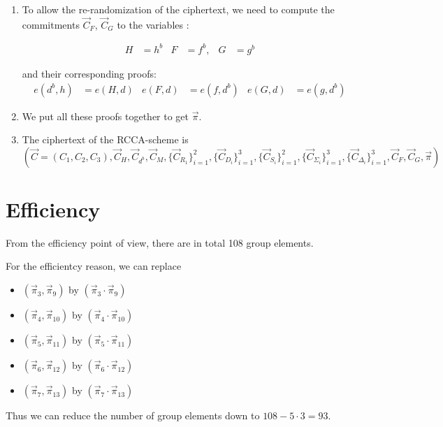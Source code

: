 \begin{description}
\begin{enumerate}
  \item To allow the re-randomization of the ciphertext, we need to compute the commitments $\vec{C}_F$, $\vec{C}_G$ to the variables :

    \begin{align*}
    H &= h^b & F &= f^b, & G&=g^b
    \end{align*}

    and their corresponding proofs:
    \begin{align}
      e(\boxed{d^b}, h) &= e(\boxed{H},d) & e(\boxed{F},d) &= e(f,\boxed{d^b}) & e(\boxed{G}, d) &= e(g, \boxed{d^b})\tag{13, 14, 15}
    \end{align}

    
  \item We put all these proofs together to get $\vec{\pi}$.
  \item The ciphertext of the RCCA-scheme is
    $$(\vec{C} = (C_1, C_2, C_3), \vec{C}_{H}, \vec{C}_{d^b}, \vec{C}_{M}, \{\vec{C}_{R_1}\}_{i= 1}^2, \{\vec{C}_{D_i}\}_{i = 1}^3, \{\vec{C}_{S_i}\}_{i = 1}^2, \{\vec{C}_{\Sigma_i}\}_{i = 1}^3,\{\vec{C}_{\Delta_i}\}_{i=1}^3, \vec{C}_F, \vec{C}_G, \vec{\pi})$$
    
  \end{enumerate}

\item[\boldmath{$ReRandom(PK, C)$}:]

\end{description}


\section{Efficiency}
From the efficiency point of view, there are in total 108 group elements.

For the efficientcy reason, we can replace
\begin{itemize}
\item $(\vec{\pi}_3,\vec{\pi}_9)$ by $(\vec{\pi}_3 \cdot \vec{\pi}_9)$
\item $(\vec{\pi}_4,\vec{\pi}_{10})$ by $(\vec{\pi}_4 \cdot\vec{\pi}_{10})$
\item $(\vec{\pi}_5,\vec{\pi}_{11})$ by $(\vec{\pi}_5 \cdot\vec{\pi}_{11})$
\item $(\vec{\pi}_6,\vec{\pi}_{12})$ by $(\vec{\pi}_6 \cdot\vec{\pi}_{12})$
\item $(\vec{\pi}_7,\vec{\pi}_{13})$ by $(\vec{\pi}_7 \cdot\vec{\pi}_{13})$
\end{itemize}

Thus we can reduce the number of group elements down to $108-5 \cdot 3 = 93$.


%
